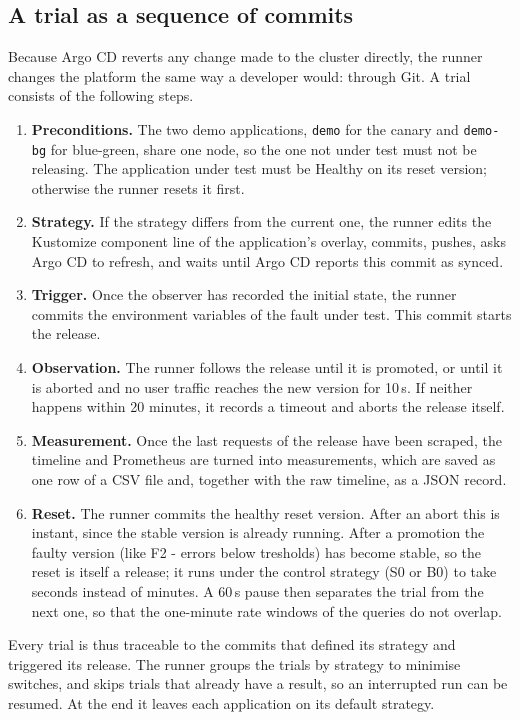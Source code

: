 \subsection{A trial as a sequence of commits}
\label{sec:EvalTrial}
Because Argo CD reverts any change made to the cluster directly, the runner changes the platform the same way a developer would: through Git. A trial consists of the following steps.
\begin{enumerate}
	\item \textbf{Preconditions.} The two demo applications, \texttt{demo} for the canary and \texttt{demo-bg} for blue-green, share one node, so the one not under test must not be releasing. The application under test must be Healthy on its reset version; otherwise the runner resets it first.
	\item \textbf{Strategy.} If the strategy differs from the current one, the runner edits the Kustomize component line of the application's overlay, commits, pushes, asks Argo CD to refresh, and waits until Argo CD reports this commit as synced.
	\item \textbf{Trigger.} Once the observer has recorded the initial state, the runner commits the environment variables of the fault under test. This commit starts the release.
	\item \textbf{Observation.} The runner follows the release until it is promoted, or until it is aborted and no user traffic reaches the new version for 10\,s. If neither happens within 20 minutes, it records a timeout and aborts the release itself.
	\item \textbf{Measurement.} Once the last requests of the release have been scraped, the timeline and Prometheus are turned into measurements, which are saved as one row of a CSV file and, together with the raw timeline, as a JSON record.
	\item \textbf{Reset.} The runner commits the healthy reset version. After an abort this is instant, since the stable version is already running. After a promotion the faulty version (like F2 - errors below tresholds) has become stable, so the reset is itself a release; it runs under the control strategy (S0 or B0) to take seconds instead of minutes. A 60\,s pause then separates the trial from the next one, so that the one-minute rate windows of the queries do not overlap.
\end{enumerate}
Every trial is thus traceable to the commits that defined its strategy and triggered its release. The runner groups the trials by strategy to minimise switches, and skips trials that already have a result, so an interrupted run can be resumed. At the end it leaves each application on its default strategy.


